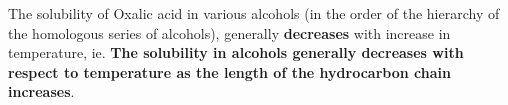 
{The solubility of Oxalic acid in various alcohols (in the order of the hierarchy of the homologous series of alcohols), generally \textbf{decreases} with increase in temperature, ie. \textbf{The solubility in alcohols generally decreases with respect to temperature as the length of the hydrocarbon chain increases}.}


